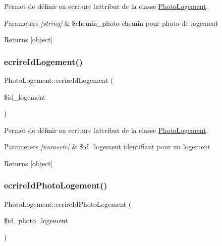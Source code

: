 Permet de définir en ecriture l\textquotesingle{}attribut de la classe \hyperlink{class_photo_logement}{Photo\+Logement}. 


\begin{DoxyParams}{Parameters}
{\em \mbox{[}string\mbox{]}} & \$chemin\+\_\+photo chemin pour photo de logement \\
\hline
\end{DoxyParams}
\begin{DoxyReturn}{Returns}
\mbox{[}object\mbox{]} 
\end{DoxyReturn}
\mbox{\label{class_photo_logement_a9baa4faf1032ad32f4a0be047689fd4c}} 
\subsubsection{\texorpdfstring{ecrire\+Id\+Logement()}{ecrireIdLogement()}}
{\footnotesize\ttfamily Photo\+Logement\+::ecrire\+Id\+Logement (\begin{DoxyParamCaption}\item[{}]{\$id\+\_\+logement }\end{DoxyParamCaption})}



Permet de définir en ecriture l\textquotesingle{}attribut de la classe \hyperlink{class_photo_logement}{Photo\+Logement}. 


\begin{DoxyParams}{Parameters}
{\em \mbox{[}numeric\mbox{]}} & \$id\+\_\+logement identifiant pour un logement \\
\hline
\end{DoxyParams}
\begin{DoxyReturn}{Returns}
\mbox{[}object\mbox{]} 
\end{DoxyReturn}
\mbox{\label{class_photo_logement_aaddea43f3f8bcc08258ef45fe4c02f0a}} 
\subsubsection{\texorpdfstring{ecrire\+Id\+Photo\+Logement()}{ecrireIdPhotoLogement()}}
{\footnotesize\ttfamily Photo\+Logement\+::ecrire\+Id\+Photo\+Logement (\begin{DoxyParamCaption}\item[{}]{\$id\+\_\+photo\+\_\+logement }\end{DoxyParamCaption})}




